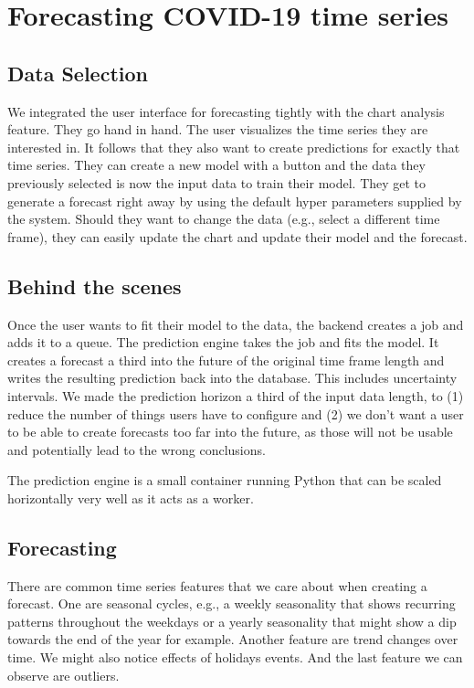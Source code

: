\section{Forecasting COVID-19 time series}


\subsection{Data Selection}
We integrated the user interface for forecasting tightly with the chart analysis feature. They go hand in hand. The user visualizes the time series they are interested in. It follows that they also want to create predictions for exactly that time series. They can create a new model with a button and the data they previously selected is now the input data to train their model. They get to generate a forecast right away by using the default hyper parameters supplied by the system. Should they want to change the data (e.g., select a different time frame), they can easily update the chart and update their model and the forecast.

\subsection{Behind the scenes}
Once the user wants to fit their model to the data, the backend creates a job and adds it to a queue. The prediction engine takes the job and fits the model. It creates a forecast a third into the future of the original time frame length and writes the resulting prediction back into the database. This includes uncertainty intervals. We made the prediction horizon a third of the input data length, to (1) reduce the number of things users have to configure and (2) we don't want a user to be able to create forecasts too far into the future, as those will not be usable and potentially lead to the wrong conclusions.

The prediction engine is a small container running Python that can be scaled horizontally very well as it acts as a worker.

\subsection{Forecasting}

There are common time series features that we care about when creating a forecast. One are seasonal cycles, e.g., a weekly seasonality that shows recurring patterns throughout the weekdays or a yearly seasonality that might show a dip towards the end of the year for example. Another feature are trend changes over time. We might also notice effects of holidays events. And the last feature we can observe are outliers.

